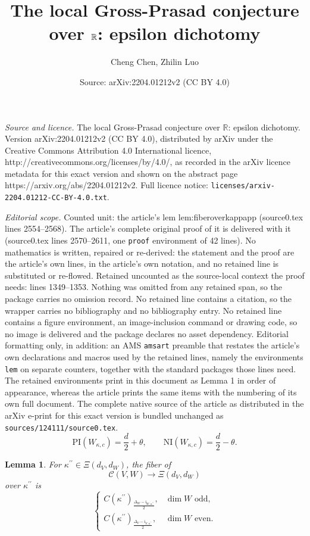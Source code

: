 \documentclass[10pt,a4paper]{amsart}
\title{The local Gross-Prasad conjecture over $\BR$: epsilon dichotomy}
\author{Cheng Chen, Zhilin Luo}
\date{Source: arXiv:2204.01212v2 (CC BY 4.0)}
\newcommand{\BR}{{\mathbb {R}}}
\newtheorem{lem}{Lemma}
\newcommand{\CC}{{\mathcal {C}}}
\def\Del{{\Delta}}
\newcommand{\Fi}{{\mathfrak {i}}}
\def\NI{\mathrm{NI}}
\def\PI{\mathrm{PI}}
\def\p{\prime}
\begin{document}
\maketitle

\noindent\emph{Source and licence.} The local Gross-Prasad conjecture over $\BR$: epsilon dichotomy. Version arXiv:2204.01212v2 (CC BY 4.0), distributed by arXiv under the Creative Commons Attribution 4.0 International licence, http://creativecommons.org/licenses/by/4.0/, as recorded in the arXiv licence metadata for this exact version and shown on the abstract page https://arxiv.org/abs/2204.01212v2. Full licence notice: \texttt{licenses/arxiv-2204.01212-CC-BY-4.0.txt}.\par\smallskip

\noindent\textit{Editorial scope.} Counted unit: the article's lem lem:fiberoverkappapp (source0.tex lines 2554--2568). The article's complete original proof of it is delivered with it (source0.tex lines 2570--2611, one \texttt{proof} environment of 42 lines). No mathematics is written, repaired or re-derived: the statement and the proof are the article's own lines, in the article's own notation, and no retained line is substituted or re-flowed.  Retained uncounted as the source-local context the proof needs: lines 1349--1353.  Nothing was omitted from any retained span, so the package carries no omission record.  No retained line contains a citation, so the wrapper carries no bibliography and no bibliography entry.  No retained line contains a figure environment, an image-inclusion command or drawing code, so no image is delivered and the package declares no asset dependency.  Editorial formatting only, in addition: an AMS \texttt{amsart} preamble that restates the article's own declarations and macros used by the retained lines, namely the environments \texttt{lem} on separate counters, together with the standard packages those lines need.  The retained environments print in this document as Lemma 1 in order of appearance, whereas the article prints the same items with the numbering of its own full document.  The complete native source of the article as distributed in the arXiv e-print for this exact version is bundled unchanged as \texttt{sources/124111/source0.tex}.
\begin{equation}\label{eq:indexofWkappac}
\PI(W_{\kappa,c})=\frac{d}{2}+\theta,
\qquad
\NI(W_{\kappa,c})=\frac{d}{2}-\theta.
\end{equation}

\begin{lem}\label{lem:fiberoverkappapp}
For $\kappa^{\p\p}\in \Xi(d_V,d_W)$, the fiber of
\[
\CC(V,W)\longrightarrow \Xi(d_V,d_W)
\]
over $\kappa^{\p\p}$ is
\[
\begin{cases}
C(\kappa^{\p\p})_{\frac{\Del_W-\Fi_{W,\kappa^{\p\p}}}{2}},
& \dim W \text{ odd},\\[4pt]
C(\kappa^{\p\p})_{\frac{\Del_V-\Fi_{V,\kappa^{\p\p}}}{2}},
& \dim W \text{ even}.
\end{cases}
\]
\end{lem}
\end{document}
